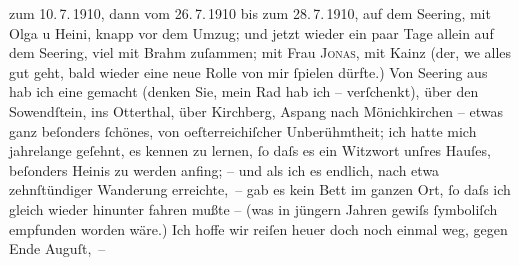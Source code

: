 \begin{ledgroupsized}[t]{13cm}
{{{                  zum 10. 7. 1910,
                  dann vom 26. 7. 1910
                  bis zum 28. 7. 1910}}}\label{K_L01952_2h}, auf dem Se{\geminationm}ering, mit Olga u Heini, knapp vor dem Umzug; und jetzt wieder ein paar Tage
               allein auf {\pb}dem Se{\geminationm}ering, viel mit Brahm zuſammen; mit Frau \textsc{Jonas}, mit Kainz (der, we{\geminationn} alles gut geht, bald wieder eine neue Rolle von mir
               ſpielen dürfte.) Von Se{\geminationm}ering aus hab ich eine \label{K_L01952_3v}\label{K_L01952_3h} gemacht (denken Sie, mein Rad hab ich – verſchenkt{\dotstwo}), über den So{\geminationn}wendſtein, ins Otterthal, über Kirchberg, Aspang nach Mönichkirchen – etwas ganz
               beſonders ſchönes, von oeſterreichiſcher
               Unberühmtheit; ich hatte mich jahrelange geſehnt, es kennen zu lernen, ſo daſs es ein
               Witzwort unſres Hauſes, beſonders Heinis zu
               werden anfing; – und als {\pb}ich es endlich, nach etwa
               zehnſtündiger Wanderung erreichte, – gab es kein Bett im ganzen Ort, ſo daſs ich
               gleich wieder hinunter fahren mußte – (was in jüngern Jahren gewiſs ſymboliſch
               empfunden worden wäre.)\pend
           \pstart
           Ich hoffe wir reiſen heuer doch noch einmal weg, gegen Ende Auguſt, –

\end{ledgroupsized}
